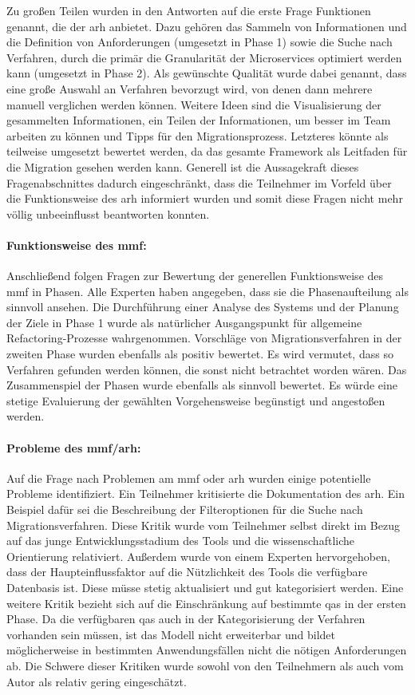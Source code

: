 Zu großen Teilen wurden in den Antworten auf die erste Frage Funktionen genannt, die der \gls{arh} anbietet.
Dazu gehören das Sammeln von Informationen und die Definition von Anforderungen (umgesetzt in Phase 1)  sowie die Suche nach Verfahren, durch die primär die Granularität der Microservices optimiert werden kann (umgesetzt in Phase 2).
Als gewünschte Qualität wurde dabei genannt, dass eine große Auswahl an Verfahren bevorzugt wird, von denen dann mehrere manuell verglichen werden können.
Weitere Ideen sind die Visualisierung der gesammelten Informationen, ein Teilen der Informationen, um besser im Team arbeiten zu können und Tipps für den Migrationsprozess.
Letzteres könnte als teilweise umgesetzt bewertet werden, da das gesamte Framework als Leitfaden für die Migration gesehen werden kann.
Generell ist die Aussagekraft dieses Fragenabschnittes dadurch eingeschränkt, dass die Teilnehmer im Vorfeld über die Funktionsweise des \gls{arh} informiert wurden und somit diese Fragen nicht mehr völlig unbeeinflusst beantworten konnten.

\paragraph{Funktionsweise des \gls{mmf}:} Anschließend folgen Fragen zur Bewertung der generellen Funk\-ti\-ons\-wei\-se des \gls{mmf} in Phasen.
Alle Experten haben angegeben, dass sie die Phasenaufteilung als sinnvoll ansehen.
Die Durchführung einer Analyse des Systems und der Planung der Ziele in Phase 1 wurde als natürlicher Ausgangspunkt für allgemeine Refactoring-Prozesse wahrgenommen.
Vorschläge von Migrationsverfahren in der zweiten Phase wurden ebenfalls als positiv bewertet.
Es wird vermutet, dass so Verfahren gefunden werden können, die sonst nicht betrachtet worden wären.
Das Zusammenspiel der Phasen wurde ebenfalls als sinnvoll bewertet.
Es würde eine stetige Evaluierung der gewählten Vorgehensweise begünstigt und angestoßen werden.

\paragraph{Probleme des \gls{mmf}/\gls{arh}:} Auf die Frage nach Problemen am \gls{mmf} oder \gls{arh} wurden einige potentielle Probleme identifiziert.
Ein Teilnehmer kritisierte die Dokumentation des \gls{arh}.
Ein Beispiel dafür sei die Beschreibung der Filteroptionen für die Suche nach Migrationsverfahren.
Diese Kritik wurde vom Teilnehmer selbst direkt im Bezug auf das junge Entwicklungsstadium des Tools und die wissenschaftliche Orientierung relativiert.
Außerdem wurde von einem Experten hervorgehoben, dass der Haupteinflussfaktor auf die Nützlichkeit des Tools die verfügbare Datenbasis ist.
Diese müsse stetig aktualisiert und gut kategorisiert werden.
Eine weitere Kritik bezieht sich auf die Einschränkung auf bestimmte \glspl{qa} in der ersten Phase.
Da die verfügbaren \glspl{qa} auch in der Kategorisierung der Verfahren vorhanden sein müssen, ist das Modell nicht erweiterbar und bildet möglicherweise in bestimmten Anwendungsfällen nicht die nötigen Anforderungen ab.
Die Schwere dieser Kritiken wurde sowohl von den Teilnehmern als auch vom Autor als relativ gering eingeschätzt.

